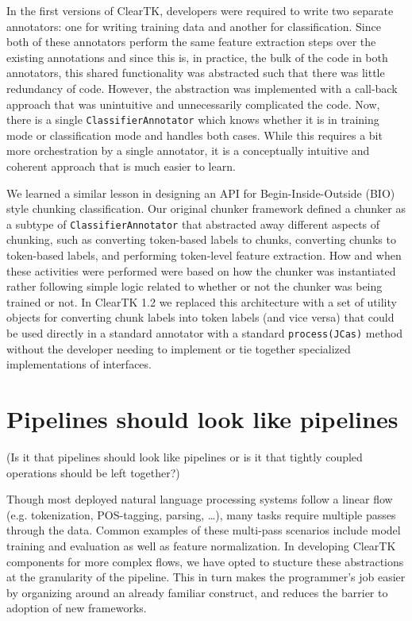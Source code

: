 \documentclass[10pt, a4paper]{article}
\newcommand{\code}[1]{\texttt{\small #1}}
\begin{document}
In the first versions of ClearTK, developers were required to write two separate annotators: one for writing training data and another for classification.  Since both of these annotators perform the same feature extraction steps over the existing annotations and since this is, in practice, the bulk of the code in both annotators, this shared functionality was abstracted such that there was little redundancy of code.  However, the abstraction was implemented with a call-back approach that was unintuitive and unnecessarily complicated the code.  Now, there is a single \code{ClassifierAnnotator} which knows whether it is in training mode or classification mode and handles both cases.  While this requires a bit more orchestration by a single annotator, it is a conceptually intuitive and coherent approach that is much easier to learn.  

We learned a similar lesson in designing an API for Begin-Inside-Outside (BIO) style chunking classification.
Our original chunker framework defined a chunker as a subtype of \code{ClassifierAnnotator} that abstracted away different aspects of chunking, such as converting token-based labels to chunks, converting chunks to token-based labels, and performing token-level feature extraction.  How and when these activities were performed were based on how the chunker was instantiated rather following simple logic related to whether or not the chunker was being trained or not.  In ClearTK 1.2 we replaced this architecture with a set of utility objects for converting chunk labels into token labels (and vice versa) that could be used directly in a standard annotator with a standard \code{process(JCas)} method without the developer needing to implement or tie together specialized implementations of interfaces.  


\section{Pipelines should look like pipelines}

(Is it that pipelines should look like pipelines or is it that tightly coupled operations should be left together?)

Though most deployed natural language processing systems follow a linear flow (e.g. tokenization, POS-tagging, parsing, \ldots), many tasks require multiple passes through the data.  Common examples of these multi-pass scenarios include model training and evaluation as well as feature normalization.  In developing ClearTK components for more complex flows, we have opted to stucture these abstractions at the granularity of the pipeline.  This in turn makes the programmer's job easier by organizing around an already familiar construct, and reduces the barrier to adoption of new frameworks.
\end{document}
